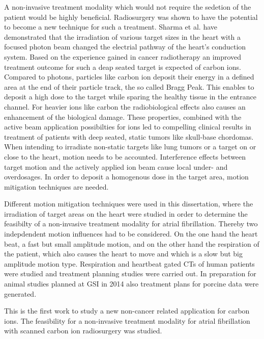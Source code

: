\documentclass[type=dr, dr=rernat, accentcolor=tud7b,colorbacktitle, bigchapter, openright, twoside, 12pt ]{tudthesis}
\begin{document}
A non-invasive treatment modality which would not require the sedetion of the patient would be highly beneficial. Radiosurgery was shown 
to have the potential to become a new technique for such a treatment. Sharma et al. \cite{Sha10} have demonstrated that the irradiation of 
various target sizes in the heart with a focused photon beam changed the electrial pathway of the heart's conduction system. 
Based on the experience gained in cancer radiotherapy an improved treatment outcome for such a deap seated target is expected of carbon ions. 
Compared to photons, particles like carbon ion deposit their energy in a defined area at the end of their particle track, the so called Bragg 
Peak. This enables to deposit a high dose to the target while sparing the healthy tissue in the entrance channel. For heavier ions like carbon 
the radiobiological effects also causes an enhancement of the biological damage. These properties, combined with the active beam application 
possibilties for ions led to compelling clinical results in treatment of patients with deep seated, static tumors like skull-base chordomas. 
When intending to irradiate non-static targets like lung tumors or a target on or close to the heart, motion needs to be accounted. 
Interference effects between target motion and the actively applied ion beam cause local under- and overdosages. In order to deposit a 
homogenous dose in the target area, motion mitigation techniques are needed. \newline

Different motion mitigation techniques were used in this dissertation, where the irradiation of target areas on the heart were studied in 
order to determine the feasibilty of a non-invasive treatment modality for atrial fibrillation. Thereby two indepdendent motion influences had 
to be considered. On the one hand the heart beat, a fast but small amplitude motion, and on the other hand the respiration of the patient, 
which also causes the heart to move and which is a slow but big amplitude motion type. Respiration and heartbeat gated CTs of human patients 
were studied and treatment planning studies were carried out. In preparation for animal studies planned at GSI in 2014 also treatment
plans for porcine data were generated. \newline

This is the first work to study a new non-cancer related application for carbon ions. The feasibility for a non-invasive treatment modality 
for atrial fibrillation with scanned carbon ion radiosurgery was studied.\newline
\end{document}
